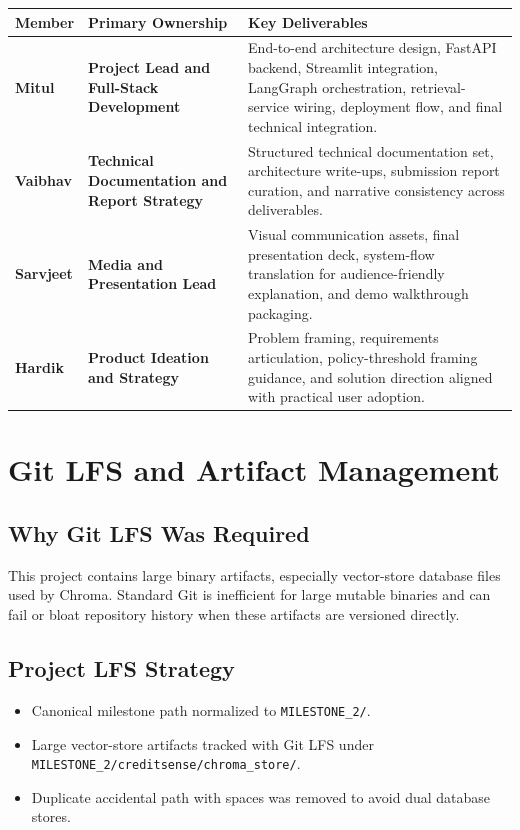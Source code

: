 \documentclass[12pt,a4paper]{article}
\begin{document}
\renewcommand{\arraystretch}{1.45}
\begin{tabularx}{\textwidth}{>{\bfseries}p{}>{\bfseries}p{}X}
\toprule
Member & Primary Ownership & Key Deliverables \\
\midrule
Mitul & Project Lead and Full-Stack Development & End-to-end architecture design, FastAPI backend, Streamlit integration, LangGraph orchestration, retrieval-service wiring, deployment flow, and final technical integration. \\
Vaibhav & Technical Documentation and Report Strategy & Structured technical documentation set, architecture write-ups, submission report curation, and narrative consistency across deliverables. \\
Sarvjeet & Media and Presentation Lead & Visual communication assets, final presentation deck, system-flow translation for audience-friendly explanation, and demo walkthrough packaging. \\
Hardik & Product Ideation and Strategy & Problem framing, requirements articulation, policy-threshold framing guidance, and solution direction aligned with practical user adoption. \\
\bottomrule
\end{tabularx}

\section{Git LFS and Artifact Management}

\subsection{Why Git LFS Was Required}
This project contains large binary artifacts, especially vector-store database files used by Chroma. Standard Git is inefficient for large mutable binaries and can fail or bloat repository history when these artifacts are versioned directly.

\subsection{Project LFS Strategy}
\begin{itemize}
    \item Canonical milestone path normalized to \texttt{MILESTONE\_2/}.
    \item Large vector-store artifacts tracked with Git LFS under \texttt{MILESTONE\_2/creditsense/chroma\_store/}.
    \item Duplicate accidental path with spaces was removed to avoid dual database stores.
\end{itemize}
\end{document}
